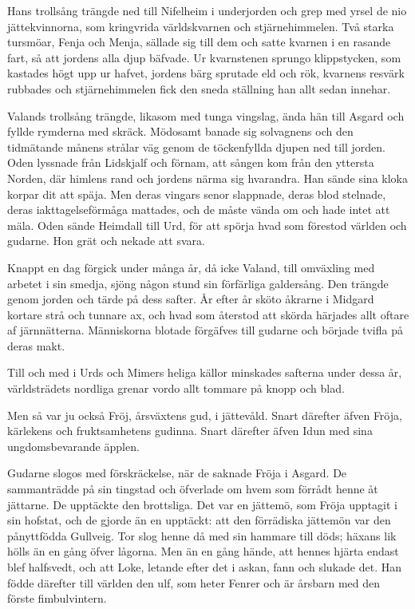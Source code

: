 Hans trollsång trängde ned till Nifelheim i underjorden och grep med
yrsel de nio jättekvinnorna, som kringvrida världskvarnen och
stjärnehimmelen. Två starka tursmöar, Fenja och Menja, sällade sig till
dem och satte kvarnen i en rasande fart, så att jordens alla djup
bäfvade. Ur
kvarnstenen\protect\hypertarget{lb1625905.xhtmlux5cux23start81}{}{}\protect\hypertarget{lb1625905.xhtmlux5cux23start81-a}{}{}\protect\hypertarget{lb1625905.xhtmlux5cux23start81-b}{}{}\protect\hypertarget{lb1625905.xhtmlux5cux23start81-c}{}{}\protect\hypertarget{lb1625905.xhtmlux5cux23start81-d}{}{}
sprungo klippstycken, som kastades högt upp ur hafvet, jordens bärg
sprutade eld och rök, kvarnens resvärk rubbades och stjärnehimmelen fick
den sneda ställning han allt sedan innehar.

Valands trollsång trängde, likasom med tunga vingslag, ända hän till
Asgard och fyllde rymderna med skräck. Mödosamt banade sig solvagnens
och den tidmätande månens strålar väg genom de töckenfyllda djupen ned
till jorden. Oden lyssnade från Lidskjalf och förnam, att sången kom
från den yttersta Norden, där himlens rand och jordens närma sig
hvarandra. Han sände sina kloka korpar dit att späja. Men deras vingars
senor slappnade, deras blod stelnade, deras iakttagelseförmåga mattades,
och de måste vända om och hade intet att mäla. Oden sände Heimdall till
Urd, för att spörja hvad som förestod världen och gudarne. Hon grät och
nekade att svara.

Knappt en dag förgick under många år, då icke Valand, till omväxling med
arbetet i sin smedja, sjöng någon stund sin förfärliga galdersång. Den
trängde genom jorden och tärde på dess safter. År efter år sköto åkrarne
i Midgard kortare strå och tunnare ax, och hvad som återstod att skörda
härjades allt oftare af järnnätterna. Människorna blotade förgäfves till
gudarne och började tvifla på deras makt.

Till och med i Urds och Mimers heliga källor minskades safterna under
dessa år, världsträdets nordliga grenar vordo allt tommare på knopp och
blad.

Men så var ju också Fröj, årsväxtens gud, i jättevåld. Snart därefter
äfven Fröja, kärlekens och fruktsamhetens gudinna. Snart därefter äfven
Idun med sina ungdomsbevarande äpplen.

Gudarne slogos med förskräckelse, när de saknade Fröja i Asgard. De
sammanträdde på sin tingstad och öfverlade om hvem som förrådt henne åt
jättarne. De upptäckte den brottsliga. Det var en jättemö, som Fröja
upptagit i sin hofstat, och de gjorde än en upptäckt: att den förrädiska
jättemön var den pånyttfödda Gullveig. Tor slog henne då med
\protect\hypertarget{lb1625905.xhtmlux5cux23start82}{}{}\protect\hypertarget{lb1625905.xhtmlux5cux23start82-a}{}{}\protect\hypertarget{lb1625905.xhtmlux5cux23start82-b}{}{}\protect\hypertarget{lb1625905.xhtmlux5cux23start82-c}{}{}\protect\hypertarget{lb1625905.xhtmlux5cux23start82-d}{}{}
sin hammare till döds; häxans lik hölls än en gång öfver lågorna. Men än
en gång hände, att hennes hjärta endast blef halfsvedt, och att Loke,
letande efter det i askan, fann och slukade det. Han födde därefter till
världen den ulf, som heter Fenrer och är årsbarn med den förste
fimbulvintern.

